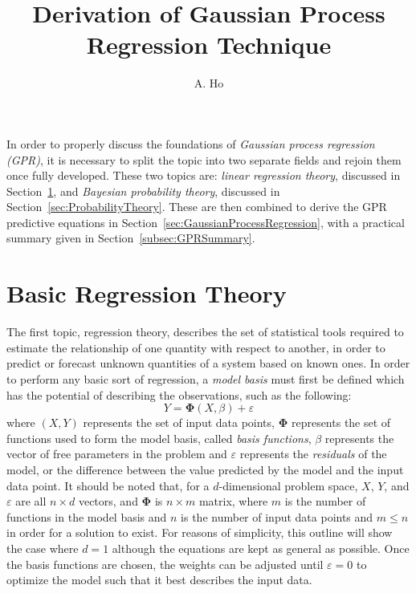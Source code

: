 \documentclass{article}
\title{Derivation of Gaussian Process Regression Technique}
\author{A. Ho}
\begin{document}
	
\maketitle

In order to properly discuss the foundations of \emph{Gaussian process regression (GPR)}, it is necessary to split the topic into two separate fields and rejoin them once fully developed. These two topics are: \emph{linear regression theory}, discussed in Section~\ref{sec:RegressionTheory}, and \emph{Bayesian probability theory}, discussed in Section~\ref{sec:ProbabilityTheory}. These are then combined to derive the GPR predictive equations in Section~\ref{sec:GaussianProcessRegression}, with a practical summary given in Section~\ref{subsec:GPRSummary}.

\section{Basic Regression Theory}
\label{sec:RegressionTheory}

The first topic, regression theory, describes the set of statistical tools required to estimate the relationship of one quantity with respect to another, in order to predict or forecast unknown quantities of a system based on known ones. In order to perform any basic sort of regression, a \emph{model basis} must first be defined which has the potential of describing the observations, such as the following:
\begin{equation}
\label{eq:StandardRegressionModel}
	Y = \mathbf{\Phi}\!\left(X,\beta\right) + \varepsilon
\end{equation}
where $\left(X,Y\right)$ represents the set of input data points, $\mathbf{\Phi}$ represents the set of functions used to form the model basis, called \emph{basis functions}, $\beta$ represents the vector of free parameters in the problem and $\varepsilon$ represents the \emph{residuals} of the model, or the difference between the value predicted by the model and the input data point. It should be noted that, for a $d$-dimensional problem space, $X$, $Y$, and $\varepsilon$ are all $n \times d$ vectors, and $\mathbf{\Phi}$ is $n \times m$ matrix, where $m$ is the number of functions in the model basis and $n$ is the number of input data points and $m \le n$ in order for a solution to exist. For reasons of simplicity, this outline will show the case where $d=1$ although the equations are kept as general as possible. Once the basis functions are chosen, the weights can be adjusted until $\varepsilon=0$ to optimize the model such that it best describes the input data.
\end{document}

